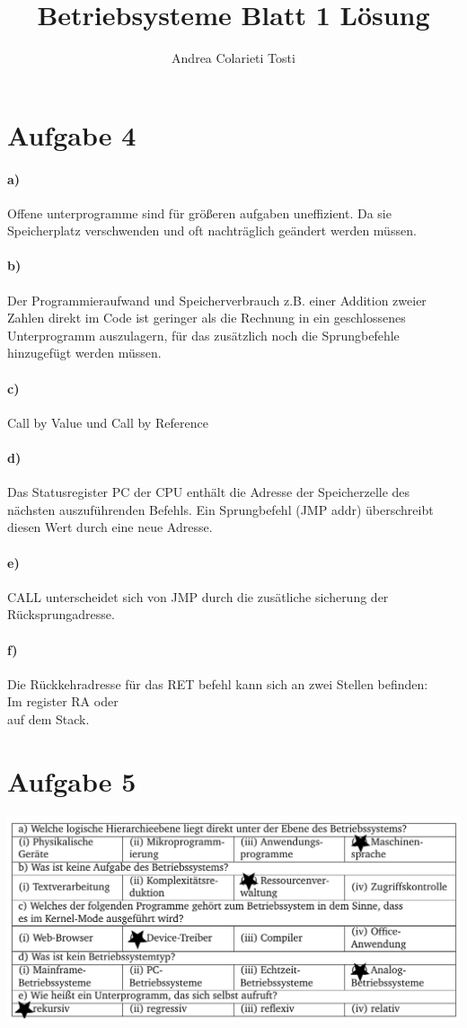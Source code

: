 \documentclass[16pt,a4paper]{article}
\author{Andrea Colarieti Tosti}
\title{Betriebsysteme Blatt 1 Lösung}
\begin{document}
\maketitle
 \section*{Aufgabe 4}

 \paragraph*{a)}
 Offene unterprogramme sind für größeren aufgaben uneffizient. Da sie Speicherplatz verschwenden und oft nachträglich geändert werden müssen.
 \paragraph*{b)}
  Der Programmieraufwand und Speicherverbrauch z.B. einer Addition zweier Zahlen
direkt im Code ist geringer als die Rechnung in ein geschlossenes Unterprogramm
auszulagern, für das zusätzlich noch die Sprungbefehle hinzugefügt werden müssen.

 \paragraph*{c)}
 Call by Value und Call by Reference
 \paragraph*{d)}
 Das Statusregister
PC der CPU enthält die Adresse der Speicherzelle
des nächsten auszuführenden Befehls. Ein Sprungbefehl (JMP addr) überschreibt diesen Wert durch eine neue Adresse.
 \paragraph*{e)}
 CALL unterscheidet sich von JMP durch die zusätliche sicherung der Rücksprungadresse.
 \paragraph*{f)}
 Die Rückkehradresse für das RET befehl kann sich an zwei Stellen befinden:\\ Im register RA oder \\
 auf dem Stack.
 \section*{Aufgabe 5}
 \includegraphics[scale=1.8]{multichoice.png} 
	
\end{document}
